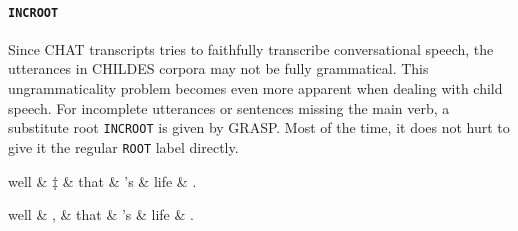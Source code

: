 \paragraph{\texttt{INCROOT}}
Since CHAT transcripts tries to faithfully transcribe conversational speech, the utterances in CHILDES corpora may not be fully grammatical. This ungrammaticality problem becomes even more apparent when dealing with child speech. For incomplete utterances or sentences missing the main verb, a substitute root \texttt{INCROOT} is given by GRASP. Most of the time, it does not hurt to give it the regular \texttt{ROOT} label directly.
\clearpage

\begin{minipage}{\widefigurewidth}
\begin{dependency}[edge slant=3pt]
    \begin{deptext}[column sep=0.7cm]
    well \& ‡ \& that \& 's \& life \& .\\
    \end{deptext}
\end{dependency}
\hfill
\begin{dependency}[edge slant=3pt]
    \begin{deptext}[column sep=0.7cm]
    well \& , \& that \& 's \& life \& .\\
    \end{deptext}
\end{dependency}
\end{minipage}
\label{fig:intj}

